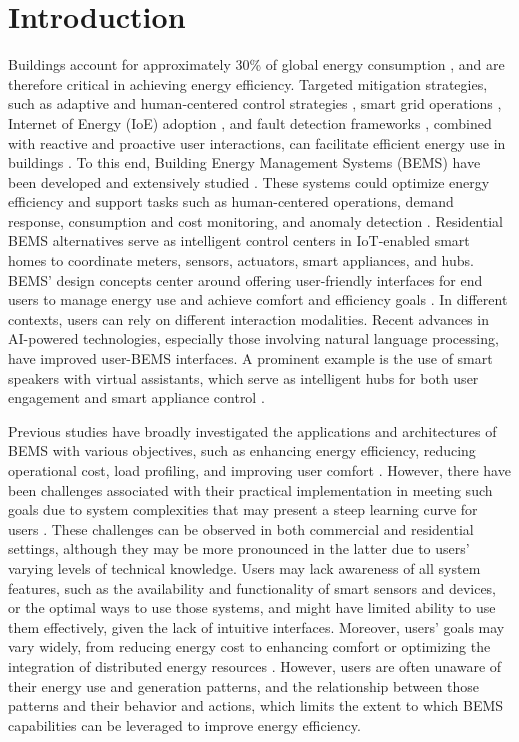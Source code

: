 \documentclass[final,3p,times]{elsarticle}
\begin{document}
\section{Introduction}

Buildings account for approximately 30\% of global energy consumption \cite{manic2016building}, and are therefore critical in achieving energy efficiency. Targeted mitigation strategies, such as adaptive and human-centered control strategies \cite{jung2019human}, smart grid operations \cite{shi2020artificial}, Internet of Energy (IoE) adoption \cite{hannan2018review}, and fault detection frameworks \cite{gu2024digital}, combined with reactive and proactive user interactions, can facilitate efficient energy use in buildings \cite{hannan2018review}. To this end, Building Energy Management Systems (BEMS) have been developed and extensively studied \cite{hannan2018review}. These systems could optimize energy efficiency and support tasks such as human-centered operations, demand response, consumption and cost monitoring, and anomaly detection \cite{hannan2018review, mariano2021review}. Residential BEMS alternatives serve as intelligent control centers in IoT-enabled smart homes to coordinate meters, sensors, actuators, smart appliances, and hubs. BEMS' design concepts center around offering user-friendly interfaces for end users to manage energy use and achieve comfort and efficiency goals \cite{mahapatra2022home}. In different contexts, users can rely on different interaction modalities. Recent advances in AI-powered technologies, especially those involving natural language processing, have improved user-BEMS interfaces. A prominent example is the use of smart speakers with virtual assistants, which serve as intelligent hubs for both user engagement and smart appliance control \cite{he2022ai}.

Previous studies have broadly investigated the applications and architectures of BEMS with various objectives, such as enhancing energy efficiency, reducing operational cost, load profiling, and improving user comfort \cite{han2023home}. However, there have been challenges associated with their practical implementation in meeting such goals due to system complexities that may present a steep learning curve for users \cite{baedeker2020interactive}. These challenges can be observed in both commercial and residential settings, although they may be more pronounced in the latter due to users' varying levels of technical knowledge. Users may lack awareness of all system features, such as the availability and functionality of smart sensors and devices, or the optimal ways to use those systems, and might have limited ability to use them effectively, given the lack of intuitive interfaces. Moreover, users' goals may vary widely, from reducing energy cost to enhancing comfort or optimizing the integration of distributed energy resources \cite{mahapatra2022home}. However, users are often unaware of their energy use and generation patterns, and the relationship between those patterns and their behavior and actions, which limits the extent to which BEMS capabilities can be leveraged to improve energy efficiency. 
\end{document}
